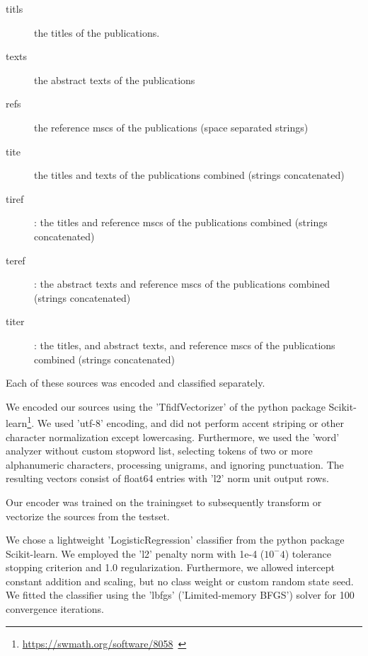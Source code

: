 \begin{description}
  \item[titls] the titles of the publications.
  \item[texts] the abstract texts of the publications
  \item[refs] the reference mscs of the publications (space separated strings)
  \item[tite] the titles and texts of the publications combined (strings concatenated)
  \item[tiref]: the titles and reference mscs of the publications combined (strings concatenated)
  \item[teref]: the abstract texts and reference mscs of the publications combined (strings concatenated)
  \item[titer]: the titles, and abstract texts, and reference mscs of the publications combined (strings concatenated)
\end{description}





Each of these sources was encoded and classified separately.


We encoded our sources using the 'TfidfVectorizer' of the python package Scikit-learn\footnote{\url{https://swmath.org/software/8058}~\cite{swSciKit}}. We used 'utf-8' encoding, and did not perform accent striping or other character normalization except lowercasing. Furthermore, we used the 'word' analyzer without custom stopword list, selecting tokens of two or more alphanumeric characters, processing unigrams, and ignoring punctuation. The resulting vectors consist of float64 entries with 'l2' norm unit output rows.



Our encoder was trained on the trainingset to subsequently transform or vectorize the sources from the testset.

We chose a lightweight 'LogisticRegression' classifier from the python package Scikit-learn. We employed the 'l2' penalty norm with 1e-4 ($10^-4$) tolerance stopping criterion and 1.0 regularization. Furthermore, we allowed intercept constant addition and scaling, but no class weight or custom random state seed. We fitted the classifier using the 'lbfgs' ('Limited-memory BFGS') solver for 100 convergence iterations.

